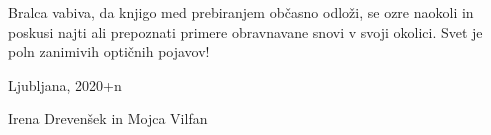 \documentclass[11pt,fleqn]{book} %
\begin{document}
Bralca vabiva, da knjigo med prebiranjem občasno odloži, se ozre
naokoli in poskusi najti ali prepoznati primere obravnavane snovi
v svoji okolici. Svet je poln zanimivih optičnih pojavov!


\vspace{1em}

Ljubljana, 2020+n

\hfill Irena Drevenšek in Mojca Vilfan

\cleardoublepage
\thispagestyle{empty}
\mbox{}
\cleardoublepage













%
%
%
\printindex
\end{document}
